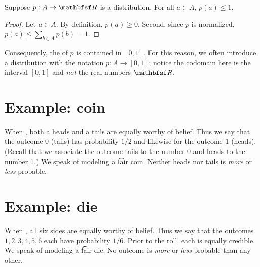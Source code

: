 \begin{proposition}
Suppose $p: A \to \R $ is a distribution.
For all $a \in A$, $p(a) \leq 1$.
\begin{proof}Let $a \in A$.
By definition, $p(a) \geq 0$.
Second, since $p$ is normalized, $p(a) \leq \sum_{b \in A} p(b) = 1$.\end{proof}
\end{proposition}

Consequently, the of $p$ is contained in $[0,1]$.
For this reason, we often introduce a distribution with the notation $p: A \to [0,1]$; notice the codomain here is the interval $[0,1]$ and \textit{not} the real numbers $\R $.

\section*{Example: coin}

When , both a heads and a tails are equally worthy of belief.
Thus we say that the outcome $0$ (tails) has probability $1/2 $ and likewise for the outcome $1$ (heads).
(Recall that we associate the outcome tails to the number 0 and heads to the number 1.)
We speak of modeling a \t{fair coin}.
Neither heads nor tails is \textit{more} or \textit{less} probable.

\section*{Example: die}

When , all six sides are equally worthy of belief.
Thus we say that the outcomes $1, 2, 3, 4, 5, 6$ each have probability $1/6 $.
Prior to the roll, each is equally credible.
We speak of modeling a \t{fair die}.
No outcome is \textit{more} or \textit{less} probable than any other.
